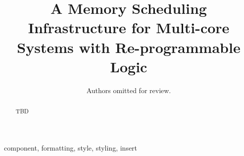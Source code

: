 \documentclass[10pt,conference]{IEEEtran}
\begin{document}
\newcommand\schim{SchIM\xspace}
\newcommand\schimL{Scheduler In-the-Middle\xspace}
\newcommand\schiml{scheduler in-the-middle\xspace}
\newcommand\axiin[1]{$\texttt{HPM}_{#1}$\xspace}
\newcommand\axiout[1]{$\texttt{HPS}_{#1}$\xspace}
\newcommand\axiconf[1]{$\texttt{LPM}_{#1}$\xspace}

\newcommand{\fig}[1]{Fig.~\ref{#1}}

\newcommand*\circledfig[2]{Fig.~\ref{#1}\tikz[baseline=0pt]{\node[anchor=south west,red,shape=circle,draw,inner sep=1pt] (char) {\scriptsize#2};}}

\newcommand*\circled[1]{\tikz[baseline=0pt]{\node[anchor=south west,red,shape=circle,draw,inner sep=1pt] (char) {\scriptsize#1};}}

\title{A Memory Scheduling Infrastructure for Multi-core Systems with
  Re-programmable Logic
}

\author{
    Authors omitted for review.
}

\maketitle

\begin{abstract}
  TBD
\end{abstract}

\begin{IEEEkeywords}
component, formatting, style, styling, insert
\end{IEEEkeywords}





%








\end{document}
